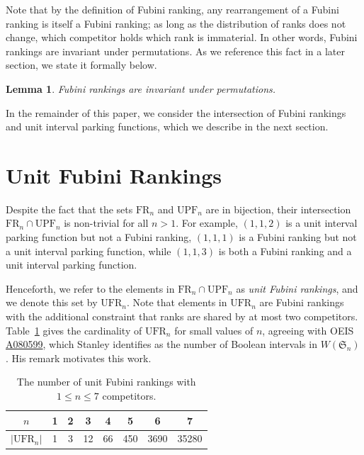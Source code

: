 \documentclass[11pt,reqno]{amsart}
\newtheorem{lemma}{Lemma}[section]
\theoremstyle{definition}
\theoremstyle{notation}
\theoremstyle{openproblem}
\newcommand{\upf}[1]{\text{UPF}_{#1}}
\newcommand{\UFR}[1]{\text{UFR}_{#1}}
\newcommand{\fr}[1]{\text{FR}_{#1}}
\begin{document}
Note that by the definition of Fubini ranking, any rearrangement of a Fubini ranking is itself a Fubini ranking; as long as the distribution of ranks does not change, which competitor holds which rank is immaterial.
In other words, Fubini rankings are invariant under permutations.
As we reference this fact in a later section, we state it formally below.
\begin{lemma}
\label{fubini perm invariant}
Fubini rankings are invariant under permutations.
\end{lemma}

In the remainder of this paper, we consider the intersection of Fubini rankings and unit interval parking functions, which we describe in the next section.

\section{Unit Fubini Rankings}\label{sec:ufr}

Despite the fact that the sets $\fr{n}$ and $\upf{n}$ are in bijection, their intersection $\fr{n}\cap \upf{n}$ is non-trivial for all $n>1$.
For example, $(1,1,2)$ is a unit interval parking function but not a Fubini ranking, $(1,1,1)$ is a Fubini ranking but not a unit interval parking function, while $(1,1,3)$ is both a Fubini ranking and a unit interval parking function. 

Henceforth, we refer to the elements in $\fr{n}\cap \upf{n}$ as \emph{unit Fubini rankings}, and we denote this set by $\UFR{n}$. 
Note that elements in $\UFR{n}$ are Fubini rankings with the additional constraint that ranks are shared by at most two competitors. 
Table~\ref{tab: UFR_n} gives the cardinality of $\UFR{n}$ for small values of $n$, agreeing with OEIS \href{https://oeis.org/A080599}{A080599}, which Stanley identifies as the number of Boolean intervals in $W(\mathfrak{S}_n)$. 
His remark motivates this work.

\begin{table}[!h]
    \centering
    \begin{tabular}{c|c|c|c|c|c|c|c}
      $n$   &  1 & 2 & 3 & 4 & 5 & 6 & 7\\
      \hline
       $|\UFR{n}|$   & 1 & 3 & 12 & 66 & 450 & 3690 & 35280
    \end{tabular}
    \caption{The number of unit Fubini rankings with $1\leq n\leq 7$ competitors.}
\label{tab: UFR_n}
\end{table}
\end{document}
